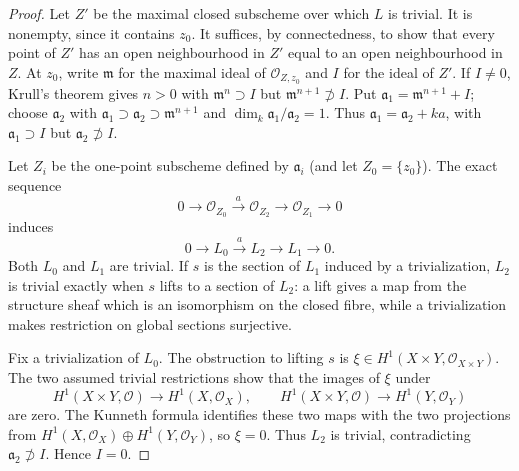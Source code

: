 \begin{proof}
Let $Z'$ be the maximal closed subscheme over which $L$ is trivial. It is
nonempty, since it contains $z_0$. It suffices, by connectedness, to show
that every point of $Z'$ has an open neighbourhood in $Z'$ equal to an open
neighbourhood in $Z$. At $z_0$, write $\mathfrak m$ for the maximal ideal
of $\mathcal O_{Z,z_0}$ and $I$ for the ideal of $Z'$. If $I\ne0$, Krull's
theorem gives $n>0$ with $\mathfrak m^n\supset I$ but
$\mathfrak m^{n+1}\not\supset I$. Put $\mathfrak a_1=\mathfrak m^{n+1}+I$;
choose $\mathfrak a_2$ with
$\mathfrak a_1\supset\mathfrak a_2\supset\mathfrak m^{n+1}$ and
$\dim_k\mathfrak a_1/\mathfrak a_2=1$. Thus
$\mathfrak a_1=\mathfrak a_2+k a$, with $\mathfrak a_1\supset I$ but
$\mathfrak a_2\not\supset I$.

Let $Z_i$ be the one-point subscheme defined by $\mathfrak a_i$ (and let
$Z_0=\{z_0\}$). The exact sequence
\[
0\to\mathcal O_{Z_0}\xrightarrow{a}\mathcal O_{Z_2}
\to\mathcal O_{Z_1}\to0
\]
induces
\[
0\to L_0\xrightarrow{a}L_2\to L_1\to0.
\]
Both $L_0$ and $L_1$ are trivial. If $s$ is the section of $L_1$ induced by
a trivialization, $L_2$ is trivial exactly when $s$ lifts to a section of
$L_2$: a lift gives a map from the structure sheaf which is an isomorphism
on the closed fibre, while a trivialization makes restriction on global
sections surjective.

Fix a trivialization of $L_0$. The obstruction to lifting $s$ is
$\xi\in H^1(X\times Y,\mathcal O_{X\times Y})$. The two assumed trivial
restrictions show that the images of $\xi$ under
\[
H^1(X\times Y,\mathcal O)\to H^1(X,\mathcal O_X),\qquad
H^1(X\times Y,\mathcal O)\to H^1(Y,\mathcal O_Y)
\]
are zero. The Kunneth formula identifies these two maps with the two
projections from
$H^1(X,\mathcal O_X)\oplus H^1(Y,\mathcal O_Y)$, so $\xi=0$. Thus $L_2$
is trivial, contradicting $\mathfrak a_2\not\supset I$. Hence $I=0$.
\end{proof}

